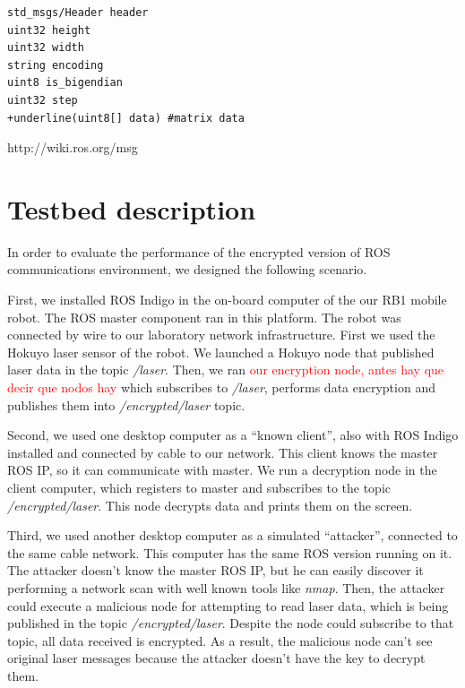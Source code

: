 \documentclass[journal,twoside]{JoPhA}
\begin{document}
{
	\footnotesize{
\begin{Verbatim}[frame=single, commandchars=+\(\)]
std_msgs/Header header
uint32 height
uint32 width
string encoding
uint8 is_bigendian
uint32 step
+underline(uint8[] data) #matrix data
\end{Verbatim}
	}
}


http://wiki.ros.org/msg


\section{Testbed description}

 

In order to evaluate the performance of the encrypted  version of ROS communications environment, we designed the following scenario.


First, we installed ROS Indigo in the on-board computer of the our RB1 mobile robot. The ROS master component ran in this platform. The robot was connected by wire to our laboratory network infrastructure. First we used the Hokuyo laser sensor of the robot. We launched a Hokuyo node that published laser data in the topic \textit{/laser}. Then, we ran {\textcolor{red}{our encryption node, antes hay que decir que nodos hay}} which subscribes to \textit{/laser}, performs data encryption and publishes them into \textit{/encrypted/laser} topic.

Second, we used one desktop computer as a ``known client'', also with ROS Indigo installed and connected by cable to our network. This client knows the master ROS IP, so it can communicate with master. We run a decryption node in the client computer, which registers to master and subscribes to the topic \textit{/encrypted/laser}. This node decrypts data and prints them on the screen.

Third, we used another desktop computer as a simulated ``attacker'', connected to the same  cable network. This computer has the same ROS version running on it. The attacker doesn't know the master ROS IP, but he can easily discover it performing a network scan with well known tools like \textit{nmap}. Then, the attacker could execute a malicious node for attempting to read laser data, which is being published in the topic \textit{/encrypted/laser}. Despite the node could subscribe to that topic, all data received is encrypted. As a result, the malicious node can't see original laser messages because the attacker doesn't have the key to decrypt them. 
\end{document}
